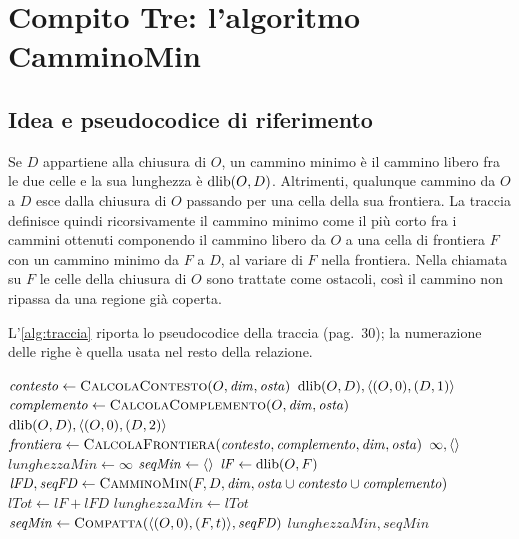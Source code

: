 \section{Compito Tre: l'algoritmo CamminoMin}
\label{sec:compito3}

\subsection{Idea e pseudocodice di riferimento}

Se $D$ appartiene alla chiusura di $O$, un cammino minimo è il cammino libero
fra le due celle e la sua lunghezza è $\operatorname{dlib}(O,D)$. Altrimenti, qualunque
cammino da $O$ a $D$ esce dalla chiusura di $O$ passando per una cella della
sua frontiera. La traccia definisce quindi ricorsivamente il cammino minimo
come il più corto fra i cammini ottenuti componendo il cammino libero da $O$
a una cella di frontiera $F$ con un cammino minimo da $F$ a $D$, al variare di
$F$ nella frontiera. Nella chiamata su $F$ le celle della chiusura di $O$
sono trattate come ostacoli, così il cammino non ripassa da una regione già
coperta.

L'\cref{alg:traccia} riporta lo pseudocodice della traccia (pag.~30); la
numerazione delle righe è quella usata nel resto della relazione.

\begin{algorithm}[H]
\caption{\cmin{} come definito nella traccia~\cite{traccia}}
\label{alg:traccia}
\begin{algorithmic}[1]
  \State $\mathit{contesto} \gets \Call{CalcolaContesto}{O, \mathit{dim}, \mathit{osta}}$
    \State \Return $\operatorname{dlib}(O,D), \langle (O,0), (D,1) \rangle$
  \EndIf
  \State $\mathit{complemento} \gets \Call{CalcolaComplemento}{O, \mathit{dim}, \mathit{osta}}$
    \State \Return $\operatorname{dlib}(O,D), \langle (O,0), (D,2) \rangle$
  \EndIf
  \State $\mathit{frontiera} \gets \Call{CalcolaFrontiera}{\mathit{contesto}, \mathit{complemento}, \mathit{dim}, \mathit{osta}}$
   
    \State \Return $\infty, \langle  \rangle$
  \EndIf
  \State $\mathit{lunghezzaMin} \gets \infty$
  \State $\mathit{seqMin} \gets \langle  \rangle$
    \State $\mathit{lF} \gets \operatorname{dlib}(O,F)$
      \State $\mathit{lFD}, \mathit{seqFD} \gets \Call{CamminoMin}{F, D, \mathit{dim}, \mathit{osta} \cup \mathit{contesto} \cup \mathit{complemento}}$
      \State $\mathit{lTot} \gets \mathit{lF} + \mathit{lFD}$
        \State $\mathit{lunghezzaMin} \gets \mathit{lTot}$
        \State $\mathit{seqMin} \gets \Call{Compatta}{\seq{(O,0),(F,t)}, \mathit{seqFD}}$
      \EndIf
    \EndIf
  \EndFor
  \State \Return $\mathit{lunghezzaMin}, \mathit{seqMin}$
\EndProcedure
\end{algorithmic}
\end{algorithm}

